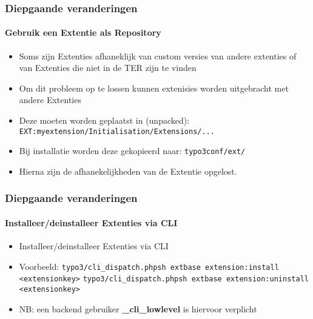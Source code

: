 
\begin{frame}[fragile]
	\frametitle{Diepgaande veranderingen}
	\framesubtitle{Gebruik een Extentie als Repository}

	\begin{itemize}
		\item Soms zijn Extenties afhaneklijk van custom versies van andere extenties of van Extenties die niet in de TER zijn te vinden
		\item Om dit probleem op te lossen kunnen extenisies worden uitgebracht met andere Extenties
		\item Deze moeten worden geplaatst in (unpacked):\newline
			\texttt{EXT:myextension/Initialisation/Extensions/...}

		\item Bij installatie worden deze gekopieerd naar:\newline
			\texttt{typo3conf/ext/}

		\item Hierna zijn de afhanekelijkheden van de Extentie opgelost.

	\end{itemize}

\end{frame}


\begin{frame}[fragile]
	\frametitle{Diepgaande veranderingen}
	\framesubtitle{Installeer/deinstalleer Extenties via CLI}

	\begin{itemize}
		\item Installeer/deinstalleer Extenties via CLI
		\item Voorbeeld:
			\lstinline!typo3/cli_dispatch.phpsh extbase extension:install <extensionkey>!
			\lstinline!typo3/cli_dispatch.phpsh extbase extension:uninstall <extensionkey>!

		\item NB: een backend gebruiker \textbf{\_cli\_lowlevel} is hiervoor verplicht
	\end{itemize}

\end{frame}

